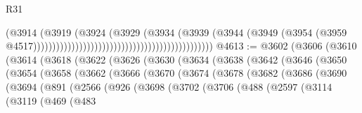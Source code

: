\begin{lexlean}{R31}
\begin{coremodule}
                                                                              (@3914
                                                                                (@3919
                                                                                  (@3924
                                                                                    (@3929
                                                                                      (@3934
                                                                                        (@3939
                                                                                          (@3944
                                                                                            (@3949
                                                                                              (@3954
                                                                                                (@3959
                                                                                                  @4517)))))))))))))))))))))))))))))))))))))))))))))))
@4613 := @3602
    (@3606
      (@3610
        (@3614
          (@3618
            (@3622
              (@3626
                (@3630
                  (@3634
                    (@3638
                      (@3642
                        (@3646
                          (@3650
                            (@3654
                              (@3658
                                (@3662
                                  (@3666
                                    (@3670
                                      (@3674
                                        (@3678
                                          (@3682
                                            (@3686
                                              (@3690
                                                (@3694
                                                  (@891
                                                    (@2566
                                                      (@926
                                                        (@3698
                                                          (@3702
                                                            (@3706
                                                              (@488
                                                                (@2597
                                                                  (@3114
                                                                    (@3119
                                                                      (@469
                                                                        (@483

\end{coremodule}
\end{lexlean}

